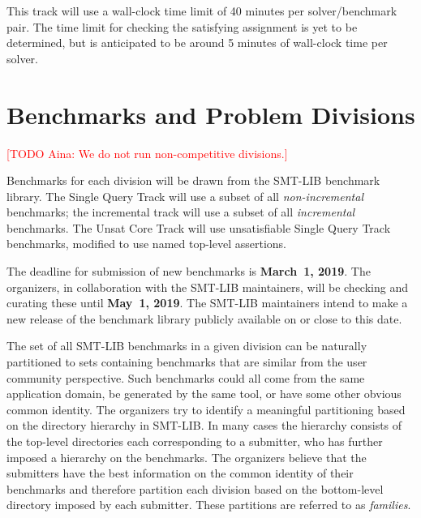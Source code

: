 \documentclass[12pt]{article}
\newcommand{\rem}[1]{\textcolor{red}{[#1]}}
\newcommand{\todo}[1]{\rem{TODO #1}}
\newcommand{\maintrack}{Single Query Track\xspace}
\newcommand{\ucoretrack}{Unsat Core Track\xspace}
\begin{document}
This track will use a wall-clock time limit of 40 minutes per solver/benchmark
pair. The time limit for checking the satisfying assignment is yet to be
determined, but is anticipated to be around 5 minutes of wall-clock time per solver.


\section{Benchmarks and Problem Divisions}

\todo{Aina: We do not run non-competitive divisions.}


%
Benchmarks for each division will be drawn from the SMT-LIB benchmark
library.  The \maintrack will use a subset of all
\emph{non-incremental} benchmarks; the incremental track will use a
subset of all \emph{incremental} benchmarks.  The \ucoretrack
will use unsatisfiable \maintrack benchmarks, modified to use named
top-level assertions.


%
The deadline for submission of new benchmarks is {\bf March~1, 2019}.
The organizers, in collaboration with the SMT-LIB maintainers, will be
checking and curating these until {\bf May~1, 2019}.  The SMT-LIB
maintainers intend to make a new release of the benchmark library
publicly available on or close to this date.

%
The set of all SMT-LIB benchmarks in a given division can be naturally
partitioned to sets containing benchmarks that are similar from the user
community perspective.  Such benchmarks could all come from the same
application domain, be generated by the same tool, or have some other
obvious common identity.
%
The organizers try to identify a meaningful partitioning based on the
directory hierarchy in SMT-LIB.  In many cases the hierarchy consists of
the top-level directories each corresponding to a submitter, who has
further imposed a hierarchy on the benchmarks.
%
The organizers believe that the submitters have the best information on
the common identity of their benchmarks and therefore partition each
division based on the bottom-level directory imposed by each submitter.
These partitions are referred to as \emph{families}.
\end{document}
